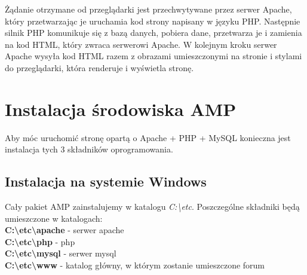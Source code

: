 \documentclass[a4paper,10pt]{article}
\begin{document}
Żądanie otrzymane od przeglądarki jest przechwytywane przez serwer Apache, który przetwarzając je uruchamia kod strony napisany w języku PHP. Następnie silnik PHP  komunikuje się z bazą danych, pobiera dane, przetwarza je i zamienia na kod HTML, który zwraca serwerowi Apache. W kolejnym kroku serwer Apache wysyła kod HTML razem z obrazami umieszczonymi na stronie i stylami do przeglądarki, która renderuje i wyświetla stronę.

\section{Instalacja środowiska AMP}
Aby móc uruchomić stronę opartą o Apache + PHP + MySQL konieczna jest instalacja tych 3 składników oprogramowania.
\subsection{Instalacja na systemie Windows}
Cały pakiet AMP zainstalujemy w katalogu \textit{C:\textbackslash etc}. Poszczególne składniki będą umieszczone w katalogach: \\
\textbf{C:\textbackslash etc\textbackslash apache} - serwer apache \\
\textbf{C:\textbackslash etc\textbackslash php} - php \\
\textbf{C:\textbackslash etc\textbackslash mysql} - serwer mysql \\
\textbf{C:\textbackslash etc\textbackslash www} - katalog główny, w którym zostanie umieszczone forum
\end{document}
